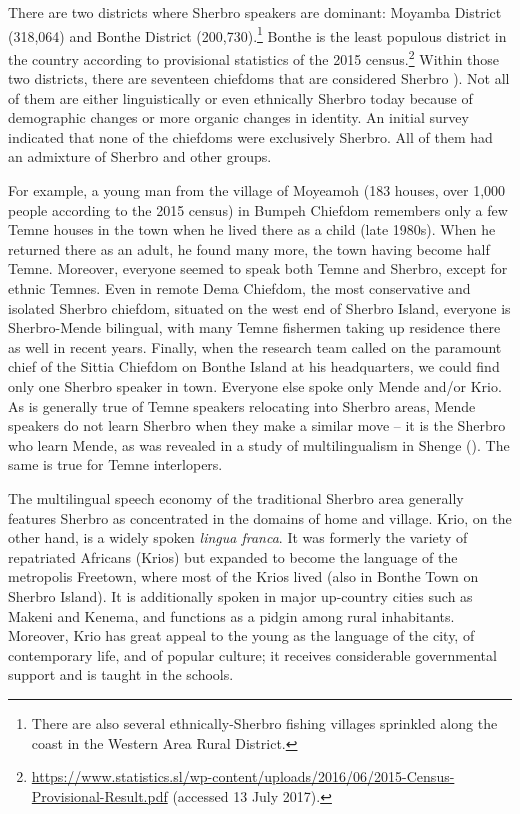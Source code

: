 There are two districts where Sherbro speakers are dominant: Moyamba District (318,064) and Bonthe District (200,730).\footnote{There are also several ethnically-Sherbro fishing villages sprinkled along the coast in the Western Area Rural District.} Bonthe is the least populous district in the country according to provisional statistics of the 2015 census.\footnote{\url{https://www.statistics.sl/wp-content/uploads/2016/06/2015-Census-Provisional-Result.pdf} (accessed 13  {July 2017}).} Within those two districts, there are seventeen chiefdoms that are considered Sherbro \citealt{ReedRobinson2013}). Not all of them are either linguistically or even ethnically Sherbro today because of demographic changes or more organic changes in identity. An initial survey indicated that none of the chiefdoms were exclusively Sherbro. All of them had an admixture of Sherbro and other groups.

For example, a young man from the village of Moyeamoh (183 houses, over 1,000 people according to the 2015 census) in Bumpeh Chiefdom remembers only a few Temne houses in the town when he lived there as a child (late 1980s). When he returned there as an adult, he found many more, the town having become half Temne. Moreover, everyone seemed to speak both Temne and Sherbro, except for ethnic Temnes. Even in remote Dema Chiefdom, the most conservative and isolated Sherbro chiefdom, situated on the west end of Sherbro Island, everyone is Sherbro-Mende bilingual, with many Temne fishermen taking up residence there as well in recent years. Finally, when the research team called on the paramount chief of the Sittia Chiefdom on Bonthe Island at his headquarters, we could find only one Sherbro speaker in town. Everyone else spoke only Mende and/or Krio. As is generally true of Temne speakers relocating into Sherbro areas, Mende speakers do not learn Sherbro when they make a similar move – it is the Sherbro who learn Mende, as was revealed in a study of multilingualism in Shenge (\citealt{Childs2019}). The same is true for Temne interlopers.

The multilingual speech economy of the traditional Sherbro area generally features Sherbro as concentrated in the domains of home and village. Krio, on the other hand, is a widely spoken \textit{lingua franca}. It was formerly the variety of repatriated Africans (Krios) but expanded to become the language of the metropolis Freetown, where most of the Krios lived (also in Bonthe Town on Sherbro Island). It is additionally spoken in major up-country cities such as Makeni and Kenema, and functions as a pidgin among rural inhabitants. Moreover, Krio has great appeal to the young as the language of the city, of contemporary life, and of popular culture; it receives considerable governmental support and is taught in the schools.

